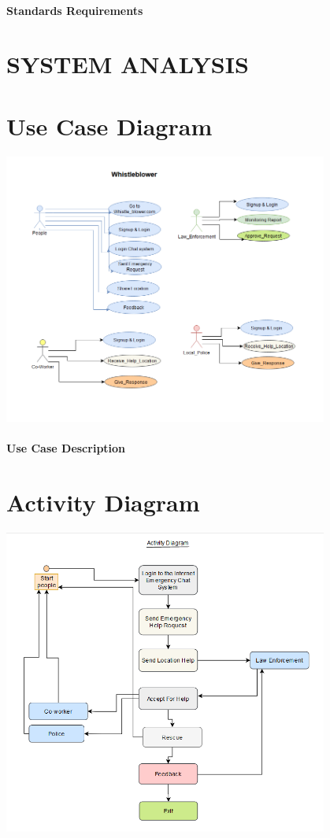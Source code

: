 \documentclass{article}
\begin{document}
\paragraph{Standards Requirements}



\newpage


\section{SYSTEM ANALYSIS}


\section{Use Case Diagram}
\includegraphics[width=0.8\textwidth]{Use_Case_Diagram.png}
\paragraph{Use Case Description}


\section{Activity Diagram}
\includegraphics[width=0.8\textwidth]{Activity_Diagram.png}
\end{document}
